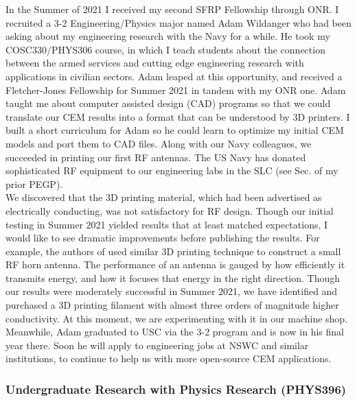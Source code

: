 \documentclass[../../../main.tex]{subfiles}
\begin{document}
In the Summer of 2021 I received my second SFRP Fellowship through ONR.  I recruited a 3-2 Engineering/Physics major named Adam Wildanger who had been asking about my engineering research with the Navy for a while.  He took my COSC330/PHYS306 course, in which I teach students about the connection between the armed services and cutting edge engineering research with applications in civilian sectors.  Adam leaped at this opportunity, and received a Fletcher-Jones Fellowship for Summer 2021 in tandem with my ONR one.  Adam taught me about computer assisted design (CAD) programs so that we could translate our CEM results into a format that can be understood by 3D printers.  I built a short curriculum for Adam so he could learn to optimize my initial CEM models and port them to CAD files.  Along with our Navy colleagues, we succeeded in printing our first RF antennas.  The US Navy has donated sophisticated RF equipment to our engineering labs in the SLC (see Sec. of my prior PEGP).
\\
\vspace{0.15cm}
We discovered that the 3D printing material, which had been advertised as electrically conducting, was not satisfactory for RF design.  Though our initial testing in Summer 2021 yielded results that at least matched expectations, I would like to see dramatic improvements before publishing the results.  For example, the authors of \cite{10.1109/access.2019.2932912} used similar 3D printing technique to construct a small RF horn antenna.  The performance of an antenna is gauged by how efficiently it transmits energy, and how it focuses that energy in the right direction.  Though our results were moderately successful in Summer 2021, we have identified and purchased a 3D printing filament with almost three orders of magnitude higher conductivity.  At this moment, we are experimenting with it in our machine shop.  Meanwhile, Adam graduated to USC via the 3-2 program and is now in his final year there.  Soon he will apply to engineering jobs at NSWC and similar institutions, to continue to help us with more open-source CEM applications.

\subsubsection{Undergraduate Research with Physics Research (PHYS396)}
\end{document}
